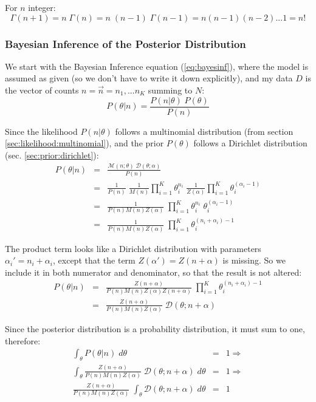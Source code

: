 For $n$ integer:
\begin{equation}
\Gamma(n + 1) = n \; \Gamma(n) = n \; (n-1) \; \Gamma(n-1) = n (n-1) (n-2) ... 1 = n!
\end{equation}

\subsubsection{Bayesian Inference of the Posterior Distribution}

We start with the Bayesian Inference equation (\ref{eq:bayesinf}), where the model is assumed as given (so we don't have to write it down explicitly), and my data $D$ is the vector of counts $n = \vec{n} = n_1, ... n_K$ summing to $N$:
\begin{equation}
P(\theta|n) = \frac{P(n|\theta) \; P(\theta)}{P(n)}
\label{eq:priorinf0}
\end{equation}

Since the likelihood $P(n|\theta)$ follows a multinomial distribution (from section \ref{sec:likelihood:multinomial}), and the prior $P(\theta)$ follows a Dirichlet distribution (sec. \ref{sec:prior:dirichlet}):
\begin{eqnarray}
P(\theta|n) & = & \frac{\mathcal{M}(n;\theta) \; \mathcal{D}(\theta;\alpha)}{P(n)}
\\
& = &
\frac{1}{P(n)} \;
\frac{1}{M(n)} \prod_{i=1}^K \theta_i ^ {n_i} \;
\frac{1}{Z(\alpha)} \prod_{i=1}^K \theta_i ^ {(\alpha_i - 1)}
\\
& = &
\frac{1}{P(n) M(n) Z(\alpha)} \;
\prod_{i=1}^K \theta_i ^ {n_i} \; \theta_i ^ {(\alpha_i - 1)}
\\
& = &
\frac{1}{P(n) M(n) Z(\alpha)} \;
\prod_{i=1}^K \theta_i ^ {(n_i + \alpha_i) - 1}
\label{eq:priorinf1}
\end{eqnarray}

The product term looks like a Dirichlet distribution with parameters $\alpha_i' = n_i + \alpha_i$, except that the term $Z(\alpha') = Z(n + \alpha)$ is missing. So we include it in both numerator and denominator, so that the result is not altered:
\begin{eqnarray}
P(\theta|n) & = &
\frac{Z(n + \alpha)}{P(n) M(n) Z(\alpha) Z(n + \alpha)} \;
\prod_{i=1}^K \theta_i ^ {(n_i + \alpha_i) - 1}
\\
& = &
\frac{Z(n + \alpha)}{P(n) M(n) Z(\alpha)} \; \mathcal{D}(\theta; n + \alpha)
\label{eq:priorinf2}
\end{eqnarray}

Since the posterior distribution is a probability distribution, it must sum to one, therefore:
\begin{eqnarray}
\int_\theta P(\theta|n) \; d\theta & = & 1 
\Rightarrow \\
\int_\theta \frac{Z(n + \alpha)}{P(n) M(n) Z(\alpha)} \; \mathcal{D}(\theta; n + \alpha) \; d\theta & = & 1
\Rightarrow \\
\frac{Z(n + \alpha)}{P(n) M(n) Z(\alpha)} \; \int_\theta \mathcal{D}(\theta; n + \alpha) \; d\theta & = & 1
\label{eq:priorinf3}
\end{eqnarray}

